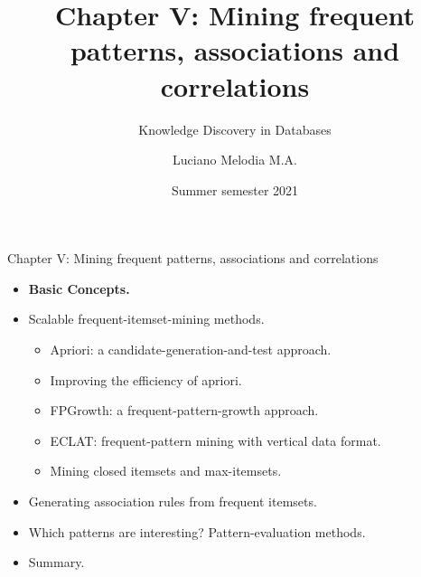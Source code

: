 \documentclass[aspectratio=169,t,xcolor=dvipsnames]{beamer}
\title[KDD]{Chapter V: Mining frequent patterns, associations and correlations}
\subtitle{Knowledge Discovery in Databases}
\author[L.~Melodia]{Luciano Melodia M.A.}
\institute[Department]{Evolutionary Data Management, Friedrich-Alexander University Erlangen-Nürnberg}
\date{Summer semester 2021}
\begin{document}
  \maketitle

  {
    \begin{frame}{Chapter V: Mining frequent patterns, associations and correlations}
        \begin{itemize}
            \item \textbf{Basic Concepts.}
            \item Scalable frequent-itemset-mining methods.
            \begin{itemize}
              \item Apriori: a candidate-generation-and-test approach.
              \item Improving the efficiency of apriori.
              \item FPGrowth:  a frequent-pattern-growth approach.
              \item ECLAT: frequent-pattern mining with vertical data format.
              \item Mining closed itemsets and max-itemsets.
            \end{itemize}
            \item Generating association rules from frequent itemsets.
            \item Which patterns are interesting? Pattern-evaluation methods.
            \item Summary.
        \end{itemize}
    \end{frame}
  }
\end{document}
